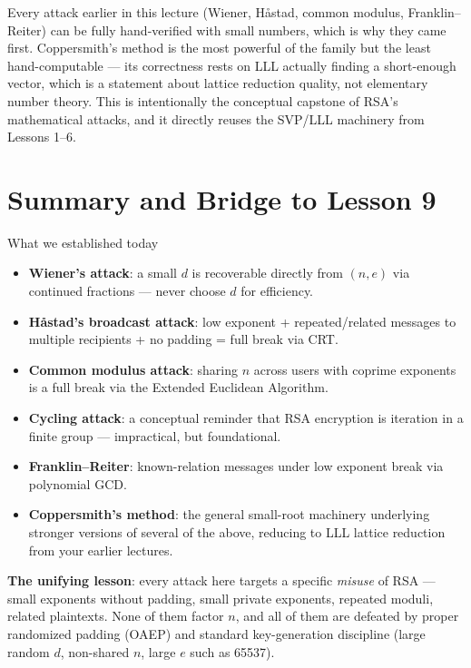 \begin{remark}
Every attack earlier in this lecture (Wiener, Håstad, common modulus, Franklin--Reiter) can be fully hand-verified with small numbers, which is why they came first. Coppersmith's method is the most powerful of the family but the least hand-computable — its correctness rests on LLL actually finding a short-enough vector, which is a statement about lattice reduction quality, not elementary number theory. This is intentionally the conceptual capstone of RSA's mathematical attacks, and it directly reuses the SVP/LLL machinery from Lessons 1--6.
\end{remark}

\newpage
\section{Summary and Bridge to Lesson 9}

\begin{keybox}{What we established today}
\begin{itemize}
\item \textbf{Wiener's attack}: a small $d$ is recoverable directly from $(n,e)$ via continued fractions — never choose $d$ for efficiency.
\item \textbf{Håstad's broadcast attack}: low exponent + repeated/related messages to multiple recipients + no padding = full break via CRT.
\item \textbf{Common modulus attack}: sharing $n$ across users with coprime exponents is a full break via the Extended Euclidean Algorithm.
\item \textbf{Cycling attack}: a conceptual reminder that RSA encryption is iteration in a finite group — impractical, but foundational.
\item \textbf{Franklin--Reiter}: known-relation messages under low exponent break via polynomial GCD.
\item \textbf{Coppersmith's method}: the general small-root machinery underlying stronger versions of several of the above, reducing to LLL lattice reduction from your earlier lectures.
\end{itemize}
\textbf{The unifying lesson}: every attack here targets a specific \emph{misuse} of RSA — small exponents without padding, small private exponents, repeated moduli, related plaintexts. None of them factor $n$, and all of them are defeated by proper randomized padding (OAEP) and standard key-generation discipline (large random $d$, non-shared $n$, large $e$ such as 65537).
\end{keybox}

